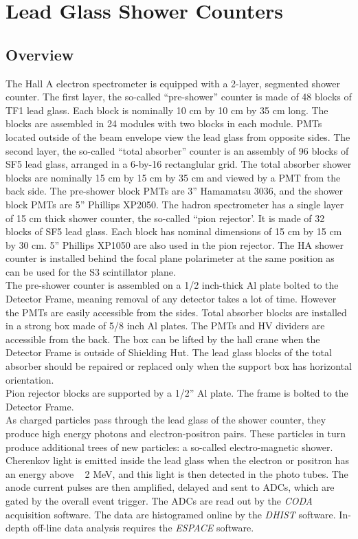 \documentclass[12pt]{article}
\begin{document}
\section{Lead Glass Shower Counters}

\subsection{Overview}

 The Hall A electron spectrometer is equipped with a 2-layer,
segmented shower counter.  The first layer, the so-called
``pre-shower'' counter is made of 48 blocks of TF1 lead glass. Each
block is nominally 10 cm by 10 cm by 35 cm long. The blocks are
assembled in 24 modules with two blocks in each module. PMTs located
outside of the beam envelope view the lead glass from opposite
sides. The second layer, the so-called ``total absorber'' counter is
an assembly of 96 blocks of SF5 lead glass, arranged in a 6-by-16
rectanglular grid.  The total absorber shower blocks are nominally 15
cm by 15 cm by 35 cm and viewed by a PMT from the back side.  The
pre-shower block PMTs are 3'' Hamamatsu 3036, and the shower block
PMTs are 5'' Phillips XP2050. The hadron spectrometer has a single
layer of 15 cm thick shower counter, the so-called ``pion
rejector'. It is made of 32 blocks of SF5 lead glass. Each block has
nominal dimensions of 15 cm by 15 cm by 30 cm. 5'' Phillips XP1050 are
also used in the pion rejector. The HA shower counter is installed
behind the focal plane polarimeter at the same position as can be used
for the S3 scintillator plane. \\


The pre-shower counter is assembled on a 1/2 inch-thick Al plate
bolted to the Detector Frame, meaning removal of any detector takes a
lot of time. However the PMTs are easily accessible from the sides.
Total absorber blocks are installed in a strong box made of 5/8 inch
Al plates.  The PMTs and HV dividers are accessible from the back. The
box can be lifted by the hall crane when the Detector Frame is outside
of Shielding Hut. The lead glass blocks of the total absorber should
be repaired or replaced only when the support box has horizontal
orientation.\\


Pion rejector blocks are supported by a 1/2'' Al plate. The frame is
bolted to the Detector Frame.\\
 
As charged particles pass through the lead glass of the shower
counter, they produce high energy photons and electron-positron pairs.
These particles in turn produce additional trees of new particles: a
so-called electro-magnetic shower.  Cherenkov light is emitted inside
the lead glass when the electron or positron has an energy above ~ 2
MeV, and this light is then detected in the photo tubes. The anode
current pulses are then amplified, delayed and sent to ADCs, which are
gated by the overall event trigger. The ADCs are read out by the {\it
CODA} acquisition software.  The data are histogramed online by the
{\it DHIST} software.  In-depth off-line data analysis requires the
{\it ESPACE} software.
\end{document}
